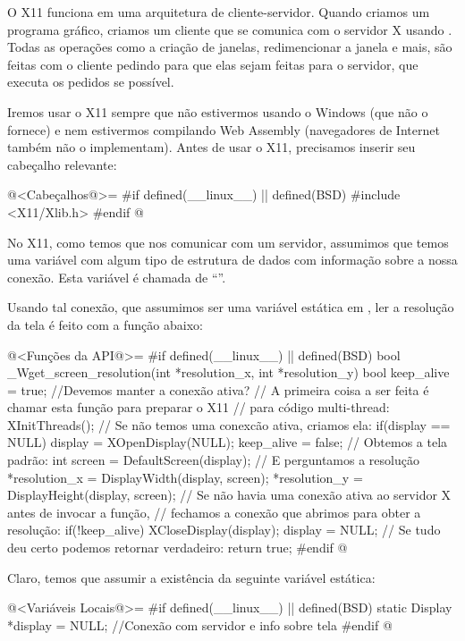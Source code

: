 O X11 funciona em uma arquitetura de cliente-servidor. Quando criamos
um programa gráfico, criamos um cliente que se comunica com o servidor
X usando . Todas as operações como a criação de
janelas, redimencionar a janela e mais, são feitas com o cliente
pedindo para que elas sejam feitas para o servidor, que executa os
pedidos se possível.

Iremos usar o X11 sempre que não estivermos usando o Windows (que não
o fornece) e nem estivermos compilando Web Assembly (navegadores de
Internet também não o implementam). Antes de usar o X11, precisamos
inserir seu cabeçalho relevante:

\iniciocodigo
@<Cabeçalhos@>=
#if defined(__linux__) || defined(BSD)
#include <X11/Xlib.h>
#endif
@
\fimcodigo

No X11, como temos que nos comunicar com um servidor, assumimos que
temos uma variável com algum tipo de estrutura de dados com informação
sobre a nossa conexão. Esta variável é chamada de
``''.

Usando tal conexão, que assumimos ser uma variável estática
em , ler a resolução da tela é feito com a função
abaixo:

\iniciocodigo
@<Funções da API@>=
#if defined(__linux__) || defined(BSD)
bool _Wget_screen_resolution(int *resolution_x, int *resolution_y){
  bool keep_alive = true; //Devemos manter a conexão ativa?
  // A primeira coisa a ser feita é chamar esta função para preparar o X11
  // para código multi-thread:
  XInitThreads();
  // Se não temos uma conexcão ativa, criamos ela:
  if(display == NULL){
    display = XOpenDisplay(NULL);
    keep_alive = false;
  }
  // Obtemos a tela padrão:
  int screen = DefaultScreen(display);
  // E perguntamos a resolução
  *resolution_x = DisplayWidth(display, screen);
  *resolution_y = DisplayHeight(display, screen);
  // Se não havia uma conexão ativa ao servidor X antes de invocar a função,
  // fechamos a conexão que abrimos para obter a resolução:
  if(!keep_alive){
    XCloseDisplay(display);
    display = NULL;
  }
  // Se tudo deu certo podemos retornar verdadeiro:
  return true;
}
#endif
@
\fimcodigo

Claro, temos que assumir a existência da seguinte variável estática:

\iniciocodigo
@<Variáveis Locais@>=
#if defined(__linux__) || defined(BSD)
static Display *display = NULL; //Conexão com servidor e info sobre tela
#endif
@
\fimcodigo


